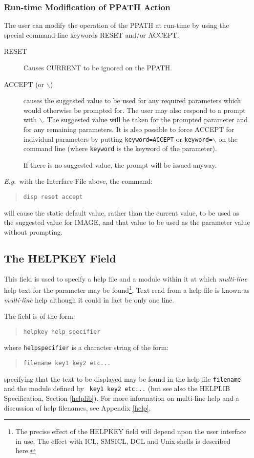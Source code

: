 \documentclass[twoside,11pt]{article}
\newcommand{\xlabel}[1]{}
\renewcommand{\_}{\texttt{\symbol{95}}}
\begin{document}
\subsubsection*{Run-time Modification of PPATH Action}
The user can modify the operation of the PPATH at run-time by using the
special command-line keywords RESET and/or ACCEPT.
\begin{description}
\item[RESET] Causes CURRENT to be ignored on the PPATH.
\item[ACCEPT (or $\backslash$)] causes the suggested value to be used for any 
required parameters which would otherwise be prompted for.
The user may also respond to a prompt with
\texttt{$\backslash$}. The suggested value will be taken for the prompted parameter and
for any remaining parameters.
It is also possible to force ACCEPT for individual parameters by putting
\texttt{keyword=ACCEPT} or \texttt{keyword=$\backslash$} on the command line (where
\texttt{keyword} is the keyword of the parameter).

If there is no suggested value, the prompt will be issued anyway.
\end{description}
{\em E.g.}\ with the Interface File above, the command:
\begin{quote} \begin{verbatim}
disp reset accept
\end{verbatim} \end{quote}
will cause the static default value, rather than the current value, 
to be used as the suggested value for IMAGE, and that value to be used as the
parameter value without prompting.

\subsection{The HELPKEY Field\xlabel{the_helpkey_field}}

This field is used to specify a help file and a module within it at which
{\em multi-line} help text for the parameter may be found\footnote{
The precise effect of the HELPKEY field will depend upon the user interface 
in use.
The effect with ICL, SMSICL, DCL and Unix shells is described here.}.
Text read from a help file is known as {\em multi-line} help although it could
in fact be only one line.

The field is of the form:
\begin{quote} \begin{verbatim}
helpkey help_specifier
\end{verbatim} \end{quote}
where \texttt{help\_specifier} is a character string of the form:
\begin{quote} \begin{verbatim}
filename key1 key2 etc...
\end{verbatim} \end{quote}
specifying that the text to be displayed may be found in the help file 
\texttt{filename} and the module defined by \texttt{ key1 key2 etc...} (but see
also the HELPLIB Specification, Section \ref{helplib}).
For more information on multi-line help and a discussion of help filenames, 
see Appendix \ref{help}.
\end{document}
